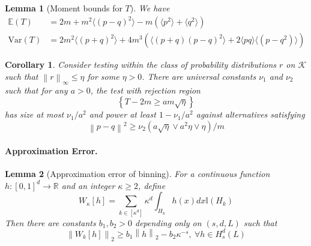 \documentclass{article}
\newcommand{\Reals}{\mathbb{R}}
\newcommand{\norm}[1]{\left\lVert#1\right\rVert}
\newcommand{\set}[1]{\left\{#1\right\}}
\newcommand{\Var}{\mathrm{Var}}
\newcommand{\1}{\mathbb{I}}
\newcommand{\Ebb}{\mathbb{E}}
\theoremstyle{alden}
\theoremstyle{aldenthm}
\newtheorem{lemma}{Lemma}
\newtheorem{corollary}{Corollary}
\theoremstyle{definition}
\theoremstyle{remark}
\begin{document}
\begin{lemma}[Moment bounds for $T$]
	We have
	\label{lem: moment_bounds_for_T}
	\begin{align*}
	\Ebb(T) & = 2m + m^2 \langle (p-q)^2  \rangle - m(\langle p^2 \rangle + \langle q^2 \rangle) \\
	\Var(T) & = 2m^2 \langle (p + q)^2 \rangle + 4m^3(\langle (p + q)(p - q)^2 \rangle + 2 \langle pq \rangle \langle (p-q^2)\rangle)
	\end{align*}
\end{lemma}

\begin{corollary}
	Consider testing within the class of probability distributions $r$ on $\mathcal{K}$ such that $\norm{r}_{\infty} \leq \eta$ for some $\eta > 0$. There are universal constants $\nu_1$ and $\nu_2$ such that for any $a > 0$, the test with rejection region
	\begin{equation*}
	\set{T - 2m \geq a m \sqrt{\eta}}
	\end{equation*}
	has size at most $\nu_1/a^2$ and power at least $1 - \nu_1/a^2$ against alternatives satisfying
	\begin{equation*}
	\norm{p - q}^2 \geq \nu_2(a \sqrt{\eta} \vee a^2 \eta \vee \eta) / m
	\end{equation*} 
\end{corollary}

\paragraph{Approximation Error.}
\begin{lemma}[Approximation error of binning]
	\label{lem: approximation_error_of_binning}
	For a continuous function $h: [0,1]^d \to \Reals$ and an integer $\kappa \geq 2$, define
	\begin{equation*}
	W_{\kappa}[h] = \sum_{k \in [\kappa^d]} \kappa^d \int_{H_k} h(x) dx \1(H_k)
	\end{equation*}
	Then there are constants $b_1, b_2 > 0$ depending only on $(s,d,L)$ such that
	\begin{equation*}
	\norm{W_k[h]}_2 \geq b_1 \norm{h}_2 - b_2 \kappa^{-s},~ \forall h \in H_s^d(L) 
	\end{equation*}
\end{lemma}
\end{document}
